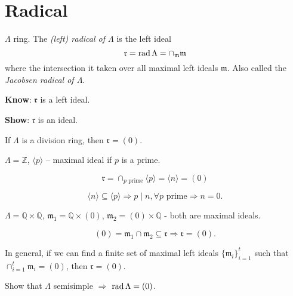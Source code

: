 \section{Radical}

\begin{defin}
$\Lambda$ ring.  The \emph{(left) radical of $\Lambda$} is the left ideal
\[\mathfrak{r} = \operatorname{rad}\nolimits \Lambda = \cap_{\mathfrak{m}} \mathfrak{m}\]
where the intersection it taken over all maximal left ideals
$\mathfrak{m}$.  Also called the \emph{Jacobsen radical of $\Lambda$}. 
\end{defin}

\textbf{Know}: $\mathfrak{r}$ is a left ideal.

\textbf{Show}: $\mathfrak{r}$ is an ideal.

\begin{exam}
If $\Lambda$ is a division ring, then $\mathfrak{r} = (0)$. 
\end{exam} 

\begin{exam}
$\Lambda = \mathbb{Z}$, $\langle p\rangle$ -- maximal ideal if $p$ is
a prime.

\[\mathfrak{r} = \cap_{p \text{\ prime}} \langle p\rangle = \langle
n\rangle = (0)\]

\[\langle n\rangle \subseteq \langle p\rangle \Rightarrow p\mid n,
\forall p \text{\ prime} \Rightarrow n = 0.\]
\end{exam}

\begin{exam}
$\Lambda = \mathbb{Q}\times \mathbb{Q}$, $\mathfrak{m}_1 =
\mathbb{Q}\times (0)$, $\mathfrak{m}_2 = (0)\times\mathbb{Q}$ - both are
maximal ideals.

\[(0) = \mathfrak{m}_1 \cap \mathfrak{m}_2 \subseteq \mathfrak{r}
  \Rightarrow \mathfrak{r} = (0).\] 
\end{exam}
In general, if we can find a finite set of maximal left ideals
$\{\mathfrak{m}_i\}_{i=1}^t$ such that $\cap_{i=1}^t \mathfrak{m}_i =
(0)$, then $\mathfrak{r} = (0)$. 

\begin{exer}
Show that $\Lambda$ semisimple $\Rightarrow$ $\operatorname{rad}\nolimits\Lambda = (0)$.
\end{exer}

